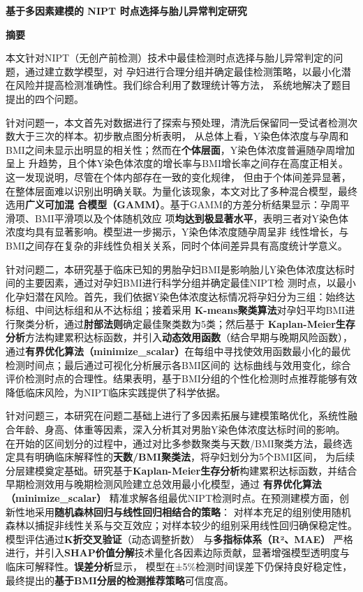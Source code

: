 \documentclass{article}
\date{}
\begin{document}
\vspace{-30pt}
\begin{center}
    \Large \textbf{基于多因素建模的 NIPT 时点选择与胎儿异常判定研究}  %
\end{center}
\vspace{-13pt}
\begin{center}
    \large \textbf{摘要}  %
\end{center}
\qquad 本文针对NIPT（无创产前检测）技术中最佳检测时点选择与胎儿异常判定的问题，通过建立数学模型，对
孕妇进行合理分组并确定最佳检测策略，以最小化潜在风险并提高检测准确性。我们综合利用了数理统计等方法，
系统地解决了题目提出的四个问题。

针对问题一，本文首先对数据进行了探索与预处理，清洗后保留同一受试者检测次数大于三次的样本。初步散点图分析表明，
从总体上看，Y染色体浓度与孕周和BMI之间未显示出明显的相关性；然而在\textbf{个体层面}，Y染色体浓度普遍随孕周增加呈上
升趋势，且个体Y染色体浓度的增长率与BMI增长率之间存在高度正相关。这一发现说明，尽管在个体内部存在一致的变化规律，
但由于个体间差异显著，在整体层面难以识别出明确关联。为量化该现象，本文对比了多种混合模型，最终选用\textbf{广义可加混
    合模型（GAMM）}。基于GAMM的方差分析结果显示：孕周平滑项、BMI平滑项以及个体随机效应
项\textbf{均达到极显著水平}，表明三者对Y染色体浓度均具有显著影响。模型进一步揭示，Y染色体浓度随孕周呈非
线性增长，与BMI之间存在复杂的非线性负相关关系，同时个体间差异具有高度统计学意义。

针对问题二，本研究基于临床已知的男胎孕妇BMI是影响胎儿Y染色体浓度达标时间的主要因素，通过对孕妇BMI进行科学分组并确定最佳NIPT检
测时点，以最小化孕妇潜在风险。首先，我们依据Y染色体浓度达标情况将孕妇分为三组：始终达标组、中间达标组和从不达标组；接着采用
\textbf{K-means聚类算法}对孕妇平均BMI进行聚类分析，通过\textbf{肘部法则}确定最佳聚类数为5类；然后基于
\textbf{Kaplan-Meier生存分析}方法构建累积达标函数，并引入\textbf{动态效用函数}（结合早期与晚期风险函数），
通过\textbf{有界优化算法（minimize\_scalar）}在每组中寻找使效用函数最小化的最优检测时间点；最后通过可视化分析展示各BMI区间的
达标曲线与效用变化，综合评价检测时点的合理性。结果表明，基于BMI分组的个性化检测时点推荐能够有效降低临床风险，为NIPT临床实践提供了科学依据。

针对问题三，本研究在问题二基础上进行了多因素拓展与建模策略优化，系统性融合年龄、身高、体重等因素，深入分析其对男胎Y染色体浓度达标时间的影响。
在开始的区间划分的过程中，通过对比多参数聚类与天数/BMI聚类方法，最终选定具有明确临床解释性的\textbf{天数/BMI聚类法}，将孕妇划分为5个BMI区间，
为后续分层建模奠定基础。研究基于\textbf{Kaplan-Meier生存分析}构建累积达标函数，并结合早期检测效用与晚期检测风险建立总效用最小化模型，通过
\textbf{有界优化算法（minimize\_scalar）} 精准求解各组最优NIPT检测时点。在预测建模方面，创新性地采用\textbf{随机森林回归与线性回归相结合的策略}：
对样本充足的组别使用随机森林以捕捉非线性关系与交互效应；对样本较少的组别采用线性回归确保稳定性。模型评估通过\textbf{K折交叉验证}（动态调整折数）
与\textbf{多指标体系（R²、MAE）} 严格进行，并引入\textbf{SHAP价值分解}技术量化各因素边际贡献，显著增强模型透明度与临床可解释性。\textbf{误差分析}显示，
模型在±5\%检测时间误差下仍保持良好稳定性，最终提出的\textbf{基于BMI分层的检测推荐策略}可信度高。
\end{document}
